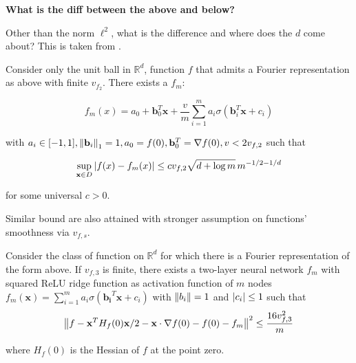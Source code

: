 \textbf{What is the diff between the above and below?}

Other than the norm $\ell^2$, what is the difference and where does the $d$ come
about? This is taken from \cite{klusowskiApproximationCombinationsReLU2018}.

\begin{theorem}
    Consider only the unit ball in $\mathbb{R}^d$, function $f$ that admits a
    Fourier representation as above with finite $v_{f_2}$. There exists a $f_m$:

    \begin{equation}
        f_m(x) = a_0 + \mathbf{b}_0^T \mathbf{x} + \frac{v}{m} \sum_{i=1}^m a_i \sigma(\mathbf{b}_i^T\mathbf{x} + c_i)
    \end{equation}

    with $a_i \in [-1,1], \left\| \mathbf{b}_i \right\|_1 = 1, a_0 = f(0), \mathbf{b}_0^T
        = \nabla f(0), v < 2v_{f,2}$ such that


    \begin{equation}
        \sup_{\mathbf{x} \in D} \left| f(x) - f_m(x) \right| \leq c v_{f,2} \sqrt{d+\log{m}} \, m^{-1/2-1/d}
    \end{equation}

    for some universal $c > 0$.
\end{theorem}

Similar bound are also attained with stronger assumption on functions'
smoothness via $v_{f,s}$.

\begin{theorem}\label{thm:appr_f3} Consider the class of function on
    $\mathbb{R}^d$ for which there is a Fourier representation of the form
    above. If $v_{f, 3}$ is finite, there exists a two-layer neural network
    $f_m$ with squared ReLU ridge function as activation function of $m$ nodes
    $f_m(\mathbf{x}) = \sum_{i=1}^m a_i \sigma(\mathbf{b_i}^T\mathbf{x} + c_i)$
    with $\left\| b_i \right\| = 1$ and $\left| c_i \right|\leq 1$ such that
    \begin{equation}
        \left\| f
            - \mathbf{x}^T H_f(0) \mathbf{x}/2
            - \mathbf{x} \cdot \nabla f(0)
            - f(0)
            - f_m \right\|^2 \leq \frac{16 v_{f, 3}^2}{m}
    \end{equation}

    where $H_f(0)$ is the Hessian of $f$ at the point zero.
\end{theorem}

